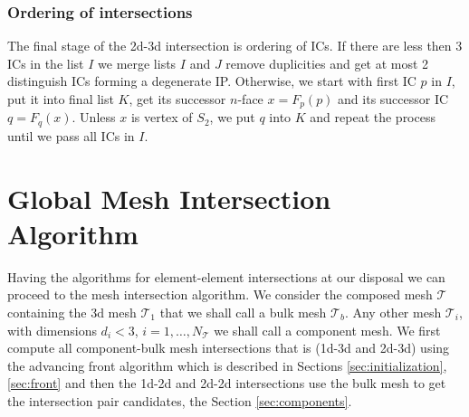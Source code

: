 \documentclass{elsarticle}
\newcommand{\notePE}[1]{{\color{Orange} \textbf{PE: } \textit{#1}}}
\newcommand{\nface}{$n$-face }
\begin{document}
% 
% 
\subsubsection{Ordering of intersections}
\label{sec:ordering}
The final stage of the 2d-3d intersection is ordering of ICs. If there are less then 3 ICs in the list $I$ we merge lists $I$ and $J$ remove duplicities
and get at most 2 distinguish ICs forming a degenerate IP. Otherwise, we start with first IC $p$ in $I$, put it into final list $K$, 
get its successor \nface $x = F_p(p)$ and its successor IC $q=F_q(x)$. Unless $x$ is vertex of $S_2$, we put $q$ into $K$ and repeat the process until 
we pass all ICs in $I$.

  

\section{Global Mesh Intersection Algorithm}
\label{sec:front_advancing}
Having the algorithms for element-element intersections at our disposal we can proceed to the mesh intersection algorithm. 
We consider the composed mesh $\mathcal T$ containing the 3d mesh $\mathcal T_1$ that we shall call a bulk mesh $\mathcal T_b$. Any other 
mesh $\mathcal T_i$, with dimensions $d_i < 3$, $i=1,\dots, N_{\mathcal T}$ we shall call a component mesh. 
We first compute all component-bulk mesh intersections that is (1d-3d and 2d-3d) using the advancing front algorithm which is described in Sections 
\ref{sec:initialization}, \ref{sec:front} and then the 1d-2d and 2d-2d 
intersections use the bulk mesh to get the intersection pair candidates, the Section \ref{sec:components}.
\end{document}
